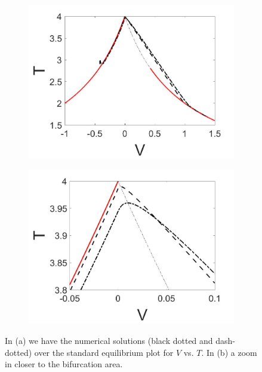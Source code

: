 \begin{figure}[H]
\centering
\begin{subfigure}{.5\textwidth}
 \centering
 \includegraphics[width=\linewidth]{twoD/slow_bif_Tplot.jpg}
 \caption{}
\end{subfigure}%
\begin{subfigure}{.5\textwidth}
 \centering
 \includegraphics[width=\linewidth]{twoD/slow_bif_Tplot_zoom.jpg}
 \caption{}
\end{subfigure}
\caption{In (a) we have the numerical solutions (black dotted and dash-dotted) over the standard equilibrium plot for $V$ vs. $T$. In (b) a zoom in closer to the bifurcation area.}
\label{fig:twoD_slow_Tnumerics}
\end{figure}

